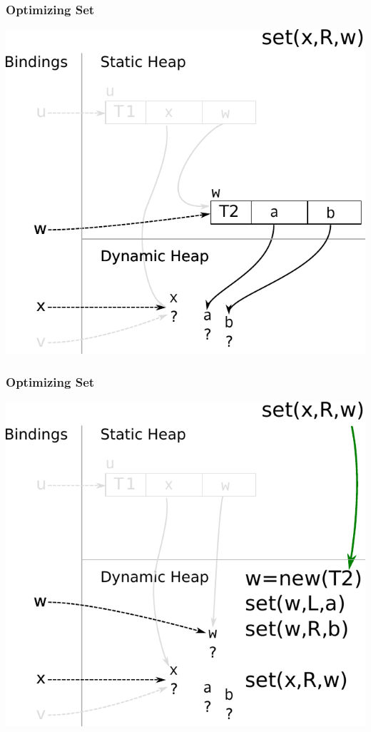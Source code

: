\documentclass[utf8x]{beamer}
\begin{document}
\begin{frame}[plain]
  \frametitle{Optimizing Set}
  \includegraphics[scale=0.8]{figures/opt_set_dynamic1}
\end{frame}

\begin{frame}[plain]
  \frametitle{Optimizing Set}
  \includegraphics[scale=0.8]{figures/opt_set_dynamic2}
\end{frame}
\end{document}
